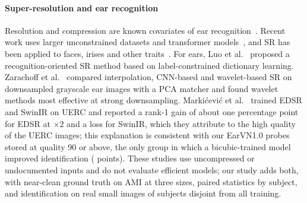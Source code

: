 \paragraph{Super-resolution and ear recognition} Resolution and compression are known covariates of ear recognition~\cite{emersic2017uerc,emersic2019uerc,rathgeb2016compression}. Recent work uses larger unconstrained datasets and transformer models~\cite{ramoscooper2022vggfaceear,emersic2023uerc,arun2026pawvit}, and SR has been applied to faces, irises and other traits~\cite{nguyen2018srbiometrics,li2019lowres}. For ears, Luo et al.~\cite{luo2014ear} proposed a recognition-oriented SR method based on label-constrained dictionary learning. Zarachoff et al.~\cite{zarachoff2018ear} compared interpolation, CNN-based and wavelet-based SR on downsampled grayscale ear images with a PCA matcher and found wavelet methods most effective at strong downsampling. Marki\'cevi\'c et al.~\cite{markicevic2023ear} trained EDSR and SwinIR on UERC and reported a rank-1 gain of about one percentage point for EDSR at $\times2$ and a loss for SwinIR, which they attribute to the high quality of the UERC images; this explanation is consistent with our EarVN1.0 probes stored at quality 90 or above, the only group in which a bicubic-trained model improved identification (\RecQHighPub{} points). These studies use uncompressed or undocumented inputs and do not evaluate efficient models; our study adds both, with near-clean ground truth on AMI at three sizes, paired statistics by subject, and identification on real small images of subjects disjoint from all training.
